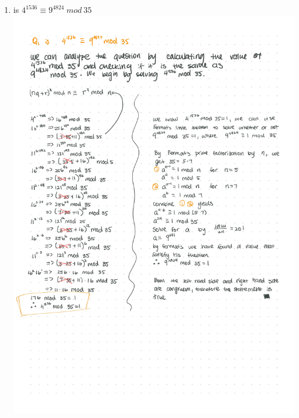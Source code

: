 \documentclass{article}
\begin{document}
    \begin{enumerate}[label=\textbf(Q1)]
        \item is $4^{1536} \equiv 9^{4824}\ mod\ 35$\\
        \includegraphics[scale=0.20, trim={0 20cm 0 0}, clip]{q1.jpg}
    \end{enumerate}
    \pagebreak
\end{document}
